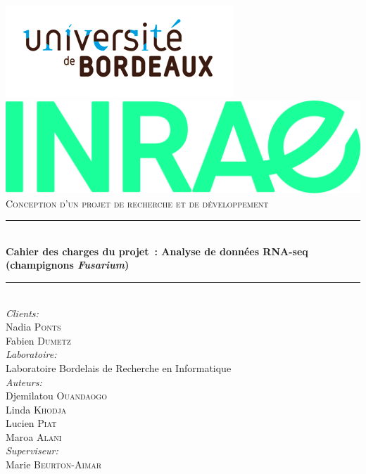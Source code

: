 \documentclass{report}
\begin{document}
\begin{titlepage}



\newcommand{\HRule}{\rule{\linewidth}{0.5mm}} %

\center %
\includegraphics[scale=0.8]{Images/logo.png}\\[1cm] %
\includegraphics[scale=0.8]{Images/logo_inrae.jpg}\\[1cm] %
\textsc{\Large Conception d'un projet de recherche et de développement}\\[0.5cm] %

\HRule \\[0.4cm]
{ \huge \bfseries Cahier des charges du projet : Analyse de données RNA-seq (champignons \textit{Fusarium})}\\[0.4cm] %
\HRule \\[1.5cm]
 
\Large \emph{Clients:}\\
Nadia \textsc{Ponts}\\
Fabien \textsc{Dumetz}\\[1cm]

\Large \emph{Laboratoire:}\\
Laboratoire Bordelais de Recherche en Informatique\\[1cm]

\Large \emph{Auteurs:}\\
Djemilatou \textsc{Ouandaogo}\\
Linda \textsc{Khodja}\\
Lucien \textsc{Piat}\\
Maroa \textsc{Alani}\\[1cm]

\Large \emph{Superviseur:}\\
 Marie \textsc{Beurton-Aimar}\\[1cm]

\vfill %
\end{titlepage}
\end{document}
